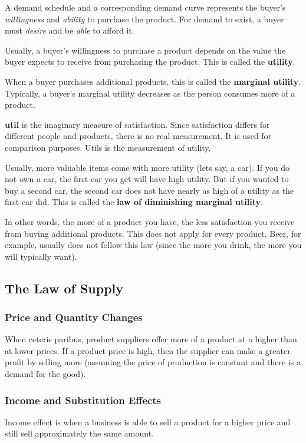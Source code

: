 \documentclass[a4paper, 12pt] {article}
\begin{document}
A demand schedule and a corresponding demand curve represents the buyer's 
\emph{willingness} and \emph{ability} to purchase the product. For demand to
exist, a buyer must \emph{desire} and be \emph{able} to afford it.

Usually, a buyer's willingness to purchase a product depends on the value the 
buyer expects to receive from purchasing the product. This is called the
\textbf{utility}.

When a buyer purchases additional products, this is called the
\textbf{marginal utility}. Typically, a buyer's marginal utility decreases as 
the person consumes more of a product.

\textbf{util} is the imaginary measure of satisfaction. Since satisfaction differs
for different people and products, there is no real measurement. It is used
for comparison purposes. Utils is the measurement of utility.

Usually, more valuable items come with more utility (lets say, a car). If you do
not own a car, the first car you get will have high utility. But if you wanted
to buy a second car, the second car does not have nearly as high of a utility as
the first car did. This is called the \textbf{law of diminishing marginal utility}.

In other words, the more of a product you have, the less satisfaction you receive
from buying additional products. This does not apply for every product. Beer,
for example, usually does not follow this law (since the more you drink, the more
you will typically want).

\subsection{The Law of Supply}

\subsubsection{Price and Quantity Changes}
When ceteris paribus, product suppliers offer more of a product at a higher than
at lower prices. If a product price is high, then the supplier can make a greater
profit by selling more (assuming the price of production is constant and there
is a demand for the good).

\subsubsection{Income and Substitution Effects}
Income effect is when a business is able to sell a product for a higher price
and still sell approximately the same amount.
\end{document}
